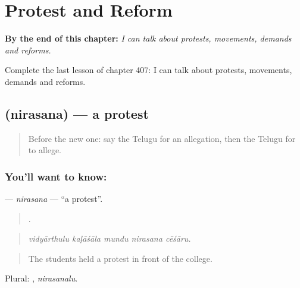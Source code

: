 
\chapter{Protest and Reform}
\label{ch:te-protest-and-reform}

\begin{chapteropening}
\textbf{By the end of this chapter:} \emph{I can talk about protests, movements, demands and reforms.}

Complete the last lesson of chapter 407: I can talk about protests, movements, demands and reforms.
\end{chapteropening}

\section[\texorpdfstring{\te{నిరసన} (nirasana)}{నిరసన (nirasana)}]{ (nirasana) — a protest}

\label{lesson:TE-C407-nirasana}



\begin{quote}
Before the new one: say the Telugu for an allegation, then the Telugu for to allege.
\end{quote}

\subsection*{You'll want to know: }
\textbf{} — \emph{nirasana} — \textquotedblleft{}a protest\textquotedblright{}.

\begin{quote}
    .
\end{quote}

\begin{quote}
\emph{vidyārthulu kaḷāśāla mundu nirasana cēśāru.}
\end{quote}

\begin{quote}
The students held a protest in front of the college.
\end{quote}

Plural: , \emph{nirasanalu}.

